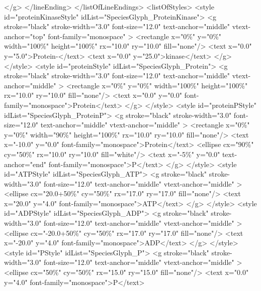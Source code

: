 {\begin{example}
          </g>
         </lineEnding>
        </listOfLineEndings>
        <listOfStyles>
         <style id="proteinKinaseStyle" idList="SpeciesGlyph_ProteinKinase">
          <g stroke="black" stroke-width="3.0" font-size="12.0" 
             text-anchor="middle" vtext-anchor="top" font-family="monospace" >
           <rectangle x="0\%" y="0\%" width="100\%" height="100\%"
                      rx="10.0" ry="10.0" fill="none"/>
           <text x="0.0" y="5.0">Protein-</text>
           <text x="0.0" y="25.0">kinase</text>
          </g>
         </style>
         <style id="proteinStyle" idList="SpeciesGlyph_Protein">
          <g stroke="black" stroke-width="3.0" font-size="12.0" 
             text-anchor="middle" vtext-anchor="middle" >
           <rectangle x="0\%" y="0\%" width="100\%" height="100\%" 
                      rx="10.0" ry="10.0" fill="none"/>
           <text x="0.0" y="0.0" font-family="monospace">Protein</text>
          </g>
         </style>
         <style id="proteinPStyle" idList="SpeciesGlyph_ProteinP">
          <g stroke="black" stroke-width="3.0" font-size="12.0" 
             text-anchor="middle" vtext-anchor="middle" >
           <rectangle x="0\%" y="0\%" width="90\%" height="100\%" 
                      rx="10.0" ry="10.0" fill="none"/>
           <text x="-10.0" y="0.0" font-family="monospace">Protein</text>
           <ellipse cx="90\%" cy="50\%" rx="10.0" ry="10.0" fill="white"/>
           <text x="-5\%" y="0.0" text-anchor="end" font-family="monospace">P</text>
          </g>
         </style>
         <style id="ATPStyle" idList="SpeciesGlyph_ATP">
          <g stroke="black" stroke-width="3.0" font-size="12.0" 
             text-anchor="middle" vtext-anchor="middle" >
           <ellipse cx="20.0+50\%" cy="50\%" rx="17.0" ry="17.0" fill="none"/>
           <text x="20.0" y="4.0" font-family="monospace">ATP</text>
          </g>
         </style>
         <style id="ADPStyle" idList="SpeciesGlyph_ADP">
          <g stroke="black" stroke-width="3.0" font-size="12.0" 
             text-anchor="middle" vtext-anchor="middle" >
           <ellipse cx="-20.0+50\%" cy="50\%" rx="17.0" ry="17.0"
                    fill="none"/>
           <text x="-20.0" y="4.0" font-family="monospace">ADP</text>
          </g>
         </style>
         <style id="PStyle" idList="SpeciesGlyph_P">
          <g stroke="black" stroke-width="3.0" font-size="12.0" 
             text-anchor="middle" vtext-anchor="middle" >
           <ellipse cx="50\%" cy="50\%" rx="15.0" ry="15.0" fill="none"/>
           <text x="0.0" y="4.0" font-family="monospace">P</text>

\end{example}}
